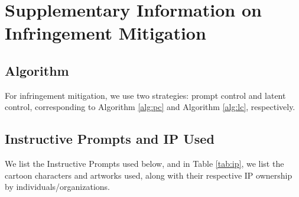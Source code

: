 \section{Supplementary Information on Infringement Mitigation}



\subsection{Algorithm}
\label{algB}
For infringement mitigation, we use two strategies: prompt control and latent control, corresponding to Algorithm \ref{alg:pc} and Algorithm \ref{alg:lc}, respectively.

\subsection{Instructive Prompts and IP Used}
\label{promptB}
We list the Instructive Prompts used below, and in Table \ref{tab:ip}, we list the cartoon characters and artworks used, along with their respective IP ownership by individuals/organizations.

